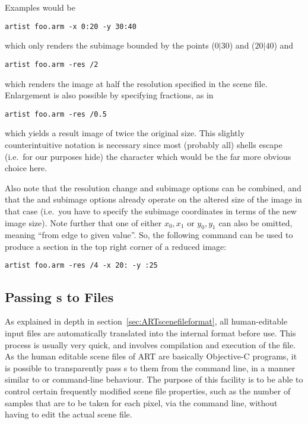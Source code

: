 Examples would be
\begin{verbatim}
artist foo.arm -x 0:20 -y 30:40
\end{verbatim}
which only renders the subimage bounded by the points ($0|30$) and ($20|40$) and
\begin{verbatim}
artist foo.arm -res /2
\end{verbatim}
which renders the image at half the resolution specified in the scene
file. Enlargement is also possible by specifying fractions, as in
\begin{verbatim}
artist foo.arm -res /0.5 
\end{verbatim}
which yields a result image of twice the original size. This slightly
counterintuitive notation is necessary since most (probably all) shells escape
(i.e.\ for our purposes hide) the \option{*} character which would be the far more
obvious choice here.

Also note that the resolution change and subimage options can be
combined, and that the  and  subimage options
already operate on the altered size of the image in that case (i.e.\ 
you have to specify the subimage coordinates in terms of the new image
size).  Note further that one of either $x_0, x_1$ or $y_0, y_1$ can
also be omitted, meaning ``from edge to given value''. So, the
following command can be used to produce a section in the top right
corner of a reduced image:
\begin{verbatim}
artist foo.arm -res /4 -x 20: -y :25
\end{verbatim}

\subsection{Passing s to  Files}

As explained in depth in section~\ref{sec:ARTscenefileformat}, all human-editable  input files are automatically translated into the internal  format before use. This process is usually very quick, and involves compilation and execution of the  file. As the human editable scene files of ART are basically Objective-C programs, it is possible to transparently pass s to them from the command line, in a manner similar to  or  command-line behaviour. The purpose of this facility is to be able to control certain frequently modified scene file properties, such as the number of samples that are to be taken for each pixel, via the command line, without having to edit the actual scene file.

